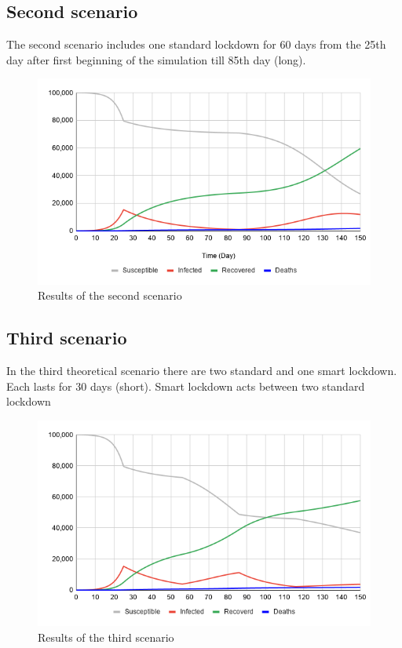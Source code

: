 \documentclass[12pt,a4paper,english]{article}
\begin{document}
    \subsection{Second scenario}
    \label{second_scenario}
    The second scenario includes one standard lockdown for 60 days from the 25th day after first beginning of the simulation till 85th day (long).
    \begin{figure}[h!]
        \centering
        \includegraphics[scale=0.55]{1large.png}
        \caption{Results of the second scenario}
    \end{figure}

    \subsection{Third scenario}
    \label{third_scenario}
    In the third theoretical scenario there are two standard and one smart lockdown.
    Each lasts for 30 days (short).
    Smart lockdown acts between two standard lockdown
    \begin{figure}[h!]
        \centering
        \includegraphics[scale=0.55]{2short+smart.png}
        \caption{Results of the third scenario}
    \end{figure}
\end{document}
